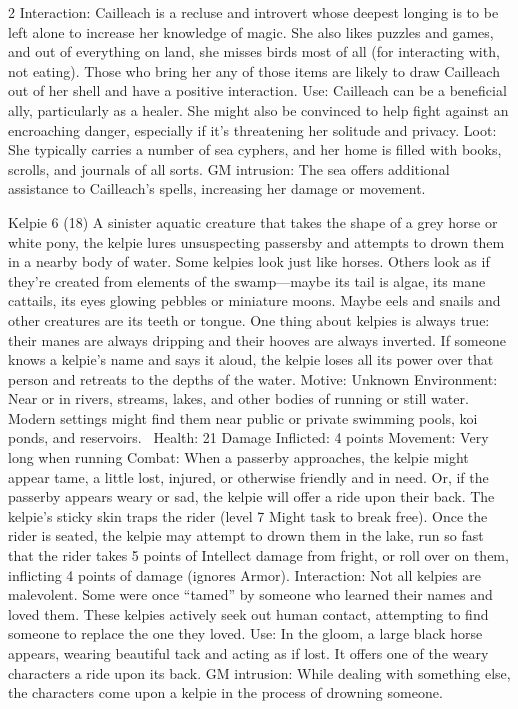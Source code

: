\begin{multicols}{2}
Interaction: Cailleach is a recluse and introvert whose deepest longing is to be left alone
to increase her knowledge of magic. She also likes puzzles and games, and out of everything on land, she misses birds most of all (for interacting with, not eating). Those who bring her any of those items are likely to draw Cailleach out of her shell and have a positive interaction.
Use: Cailleach can be a beneficial ally, particularly as a healer. She might also be convinced to help fight against an encroaching danger, especially if it’s threatening her solitude and privacy.
Loot: She typically carries a number of sea cyphers, and her home is filled with books, scrolls, and journals of all sorts.
GM intrusion: The sea offers additional assistance to Cailleach’s spells, increasing her damage or movement.

Kelpie 6 (18)
A sinister aquatic creature that takes the shape of a grey horse or white pony, the kelpie lures unsuspecting passersby and attempts to drown them in a nearby body of water.
Some kelpies look just like horses. Others look as if they’re created from elements of the swamp—maybe its tail is algae, its mane cattails, its eyes glowing pebbles or miniature moons. Maybe eels and snails and other creatures are its teeth or tongue. One thing about kelpies is always true: their manes are always dripping and their hooves are always inverted.
If someone knows a kelpie’s name and says it aloud, the kelpie loses all its power over that person and retreats to the depths of the water.
Motive: Unknown
Environment: Near or in rivers, streams, lakes, and other bodies of running or still water.
Modern settings might find them near public or private swimming pools, koi ponds,
and reservoirs. 
Health: 21
Damage Inflicted: 4 points
Movement: Very long when running
Combat: When a passerby approaches, the kelpie might appear tame, a little lost, injured,
or otherwise friendly and in need. Or, if the passerby appears weary or sad, the kelpie will offer a ride upon their back. The kelpie’s sticky skin traps the rider (level 7 Might task to break free). Once the rider is seated, the kelpie may attempt to drown them in the lake, run so fast that the rider takes 5 points of Intellect damage from fright, or roll over on them, inflicting 4 points of damage (ignores Armor).
Interaction: Not all kelpies are malevolent. Some were once “tamed” by someone who learned their names and loved them. These kelpies actively seek out human contact, attempting to find someone to replace the one they loved.
Use: In the gloom, a large black horse appears, wearing beautiful tack and acting as if lost. It offers one of the weary characters a ride upon its back.
GM intrusion: While dealing with something else, the characters come upon a kelpie in the process of drowning someone.


\end{multicols}
